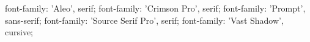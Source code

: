 font-family: 'Aleo', serif;
font-family: 'Crimson Pro', serif;
font-family: 'Prompt', sans-serif;
font-family: 'Source Serif Pro', serif;
font-family: 'Vast Shadow', cursive;